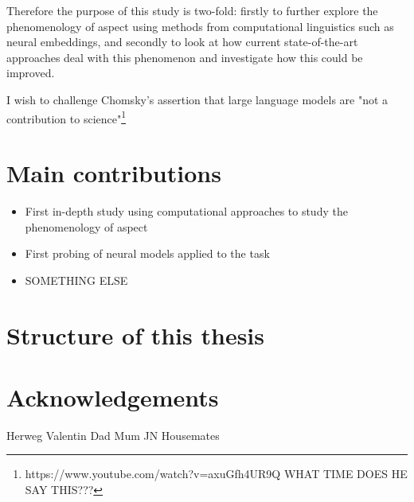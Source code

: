 Therefore the purpose of this study is two-fold: firstly to further explore the phenomenology of aspect using methods from computational linguistics such as neural embeddings, and secondly to look at how current state-of-the-art approaches deal with this phenomenon and investigate how this could be improved.


I wish to challenge Chomsky's assertion that large language models are "not a contribution to science"\footnote{https://www.youtube.com/watch?v=axuGfh4UR9Q WHAT TIME DOES HE SAY THIS???}

\section*{Main contributions}
\begin{itemize}
    \item First in-depth study using computational approaches to study the phenomenology of aspect 
    \item First probing of neural models applied to the task
    \item SOMETHING ELSE
\end{itemize}
\section*{Structure of this thesis}

\section*{Acknowledgements}
Herweg
Valentin
Dad
Mum
JN
Housemates